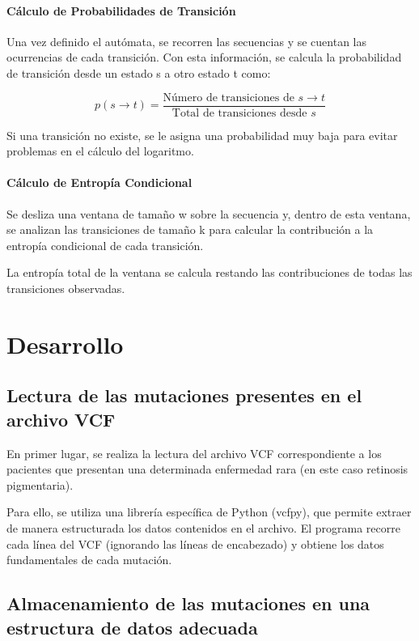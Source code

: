 \documentclass[11pt,spanish,listoffigures,listoftables]{tfgetsinf}
\begin{document}
\subsubsection{Cálculo de Probabilidades de Transición}
Una vez definido el autómata, se recorren las secuencias y se cuentan las ocurrencias de cada transición. Con esta información, se calcula la probabilidad de transición desde un estado s a otro estado t como:

\[
p(s \to t) = \frac{\text{Número de transiciones de } s \to t}{\text{Total de transiciones desde } s}
\]

Si una transición no existe, se le asigna una probabilidad muy baja para evitar problemas en el cálculo del logaritmo.

\subsubsection{Cálculo de Entropía Condicional}

Se desliza una ventana de tamaño w sobre la secuencia y, dentro de esta ventana, se analizan las transiciones de tamaño k para calcular la contribución a la entropía condicional de cada transición.

La entropía total de la ventana se calcula restando las contribuciones de todas las transiciones observadas.


\chapter{Desarrollo}

\section{Lectura de las mutaciones presentes en el archivo VCF}

En primer lugar, se realiza la lectura del archivo VCF correspondiente a los pacientes que presentan una determinada enfermedad rara (en este caso retinosis pigmentaria).

Para ello, se utiliza una librería específica de Python (vcfpy), que permite extraer de manera estructurada los datos contenidos en el archivo. El programa recorre cada línea del VCF (ignorando las líneas de encabezado) y obtiene los datos fundamentales de cada mutación.

\section{Almacenamiento de las mutaciones en una estructura de datos adecuada}
\end{document}
